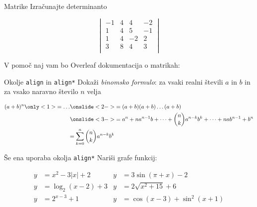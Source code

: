 \begin{frame}{Matrike}
	Izračunajte determinanto
	
	$$	
	\begin{vmatrix} 
		-1 & 4 & 4 & -2 \\
		1 & 4 & 5 & -1 \\
		1 & 4 & -2 & 2 \\
		3 & 8 & 4 & 3 \\
	\end{vmatrix}
	$$
	
	V pomoč naj vam bo Overleaf dokumentacija o matrikah:
	
	\href{https://www.overleaf.com/learn/latex/Matrices}{}
\end{frame}

\begin{frame}{Okolje \texttt{align} in \texttt{align*}}
	Dokaži \emph{binomsko formulo}: za vsaki realni števili $a$ in $b$ in za vsako naravno število $n$ velja
	

    \begin{align*}
        (a+b)^n \only<1>{=\ldots}  
        &\onslide<2->{= (a+b)(a+b) \dots (a+b)} \\
        &\onslide<3->{= a^n + n a^{n-1} b + \dots + \binom{n}{k} a^{n-k} b^k + \dots + n a b^{n-1} + b^n} \\
        &{ = \sum_{k=0}^n \binom{n}{k} a^{n-k} b^k}
    \end{align*}
	
\end{frame}

\begin{frame}{Še ena uporaba okolja \texttt{align*}}
	Nariši grafe funkcij:
	
	\begin{align*}
		y &= x^2 - 3|x| + 2   & y &= 3 \sin(\pi+x) - 2 \\
		y &= \log_2(x-2) + 3  & y &= 2 \sqrt{x^2+15} + 6 \\
		y &= 2^{x-3} + 1      & y &= \cos(x-3) + \sin^2(x+1) 
	\end{align*}
\end{frame}

